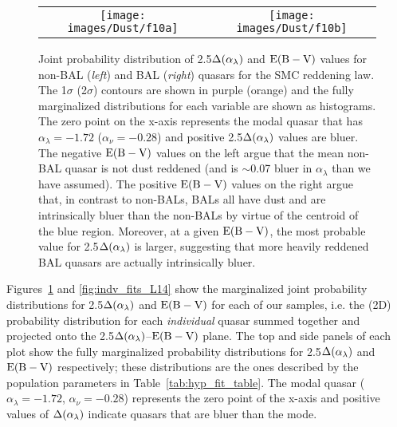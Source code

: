\begin{figure*}[t]
\begin{center}
\begin{tabular}{cc}
\texttt{[image: images/Dust/f10a]} & \texttt{[image: images/Dust/f10b]} \\
\end{tabular}
\caption[Joint probability distribution of 2.5$\dal$ and $\ebv$]{\label{fig:indv_fits_SMC} Joint probability distribution of 2.5$\dal$ and $\ebv$ values for non-BAL ({\em left}) and BAL ({\em right}) quasars for the SMC reddening law. The 1$\sigma$ (2$\sigma$) contours are shown in purple (orange) and the fully marginalized distributions for each variable are shown as histograms.  The zero point on the x-axis represents the modal quasar that has $\alpha_{\lambda} =-1.72$ ($\alpha_{\nu}=-0.28$) and positive 2.5$\dal$ values are bluer.  The negative $\ebv$ values on the left argue that the mean non-BAL quasar is not dust reddened (and is $\sim$0.07 bluer in $\alpha_{\lambda}$ than we have assumed).  The positive $\ebv$ values on the right argue that, in contrast to non-BALs, BALs all have dust and are intrinsically bluer than the non-BALs by virtue of the centroid of the blue region. Moreover, at a given $\ebv$, the most probable value for 2.5$\dal$ is larger, suggesting that more heavily reddened BAL quasars are actually intrinsically bluer.}
\end{center}
\end{figure*}

Figures~\ref{fig:indv_fits_SMC} and \ref{fig:indv_fits_L14} show the marginalized joint probability distributions for 2.5$\dal$ and $\ebv$ for each of our samples, i.e. the (2D) probability distribution for each {\em individual} quasar summed together and projected onto the 2.5$\dal$--$\ebv$ plane.  The top and side panels of each plot show the fully marginalized probability distributions for 2.5$\dal$ and $\ebv$ respectively; these distributions are the ones described by the population parameters in Table~\ref{tab:hyp_fit_table}.  The modal quasar ($\alpha_{\lambda} =-1.72$, $\alpha_{\nu}=-0.28$) represents the zero point of the x-axis and positive values of $\dal$ indicate quasars that are bluer than the mode.  

